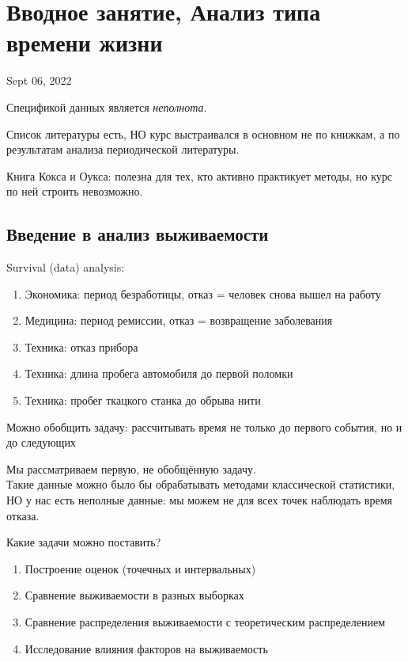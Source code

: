 \documentclass[main.tex]{sufbfiles}
\begin{document}
\section{ Вводное занятие, Анализ типа времени жизни }
Sept 06, 2022

Спецификой данных является \textit{неполнота}.

Список литературы есть, НО курс выстраивался в основном не по книжкам, а по результатам анализа периодической литературы.

Книга Кокса и Оукса: полезна для тех, кто активно практикует методы, но курс по ней строить невозможно.

\subsection{Введение в анализ выживаемости}
Survival (data) analysis:

\begin{enumerate}[noitemsep]
	\item Экономика: период безработицы, отказ = человек снова вышел на работу
	\item Медицина: период ремиссии, отказ = возвращение заболевания
	\item Техника: отказ прибора
	\item Техника: длина пробега автомобиля до первой поломки
	\item Техника: пробег ткацкого станка до обрыва нити
\end{enumerate}

Можно обобщить задачу: рассчитывать время не только до первого события, но и до следующих

Мы рассматриваем первую, не обобщённую задачу. \\

Такие данные можно было бы обрабатывать методами классической статистики, НО у нас есть неполные данные: мы можем не для всех точек наблюдать время отказа.

Какие задачи можно поставить?
\begin{enumerate}[noitemsep]
	\item Построение оценок (точечных и интервальных)
	\item Сравнение выживаемости в разных выборках
	\item Сравнение распределения выживаемости с теоретическим распределением
	\item Исследование влияния факторов на выживаемость
\end{enumerate}
\end{document}
